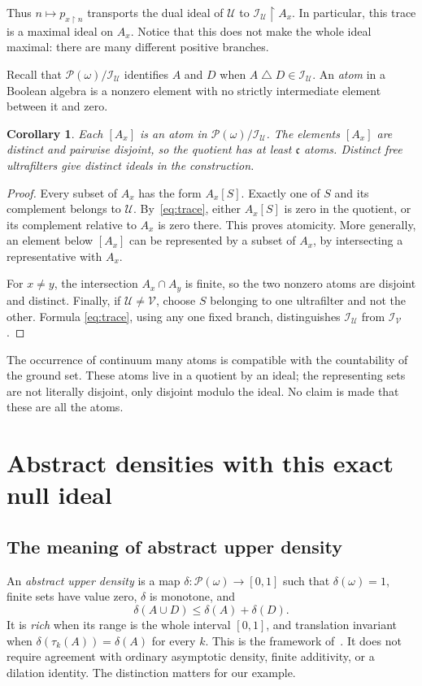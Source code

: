 \documentclass[11pt,a4paper]{article}
\newtheorem{corollary}[theorem]{Corollary}
\theoremstyle{definition}
\theoremstyle{remark}
\newcommand{\I}{\mathcal I}
\newcommand{\U}{\mathcal U}
\newcommand{\Pow}{\mathcal P}
\newcommand{\cfr}{\mathfrak c}
\newcommand{\sh}[2]{\tau_{#1}(#2)}
\newcommand{\restr}{\mathbin{\upharpoonright}}
\begin{document}
Thus $n\mapsto p_{x\restr n}$ transports the dual ideal of $\U$ to
$\I_\U\restr A_x$. In particular, this trace is a maximal ideal on
$A_x$. Notice that this does not make the whole ideal maximal: there
are many different positive branches.

Recall that $\Pow(\omega)/\I_\U$ identifies $A$ and $D$ when
$A\mathbin\triangle D\in\I_\U$. An \emph{atom} in a Boolean algebra is
a nonzero element with no strictly intermediate element between it and
zero.

\begin{corollary}
\label{cor:atoms}
Each $[A_x]$ is an atom in $\Pow(\omega)/\I_\U$. The elements $[A_x]$
are distinct and pairwise disjoint, so the quotient has at least
$\cfr$ atoms. Distinct free ultrafilters give distinct ideals in the
construction.
\end{corollary}
\begin{proof}
Every subset of $A_x$ has the form $A_x[S]$. Exactly one of $S$ and its
complement belongs to $\U$. By~\eqref{eq:trace}, either $A_x[S]$ is zero
in the quotient, or its complement relative to $A_x$ is zero there.
This proves atomicity. More generally, an element below $[A_x]$ can be
represented by a subset of $A_x$, by intersecting a representative with
$A_x$.

For $x\ne y$, the intersection $A_x\cap A_y$ is finite, so the two
nonzero atoms are disjoint and distinct. Finally, if $\U\ne\mathcal V$,
choose $S$ belonging to one ultrafilter and not the other. Formula
\eqref{eq:trace}, using any one fixed branch, distinguishes
$\I_\U$ from $\I_{\mathcal V}$.
\end{proof}

The occurrence of continuum many atoms is compatible with the
countability of the ground set. These atoms live in a quotient by an
ideal; the representing sets are not literally disjoint, only disjoint
modulo the ideal. No claim is made that these are all the atoms.

\section{Abstract densities with this exact null ideal}
\label{sec:density}

\subsection{The meaning of abstract upper density}
An \emph{abstract upper density} is a map
$\delta:\Pow(\omega)\to[0,1]$ such that $\delta(\omega)=1$, finite sets
have value zero, $\delta$ is monotone, and
\[
                       \delta(A\cup D)\le\delta(A)+\delta(D).
\]
It is \emph{rich} when its range is the whole interval $[0,1]$, and
translation invariant when $\delta(\sh{k}{A})=\delta(A)$ for every $k$.
This is the framework of~\cite{DNJ,FT}. It does not require agreement
with ordinary asymptotic density, finite additivity, or a dilation
identity. The distinction matters for our example.
\end{document}
